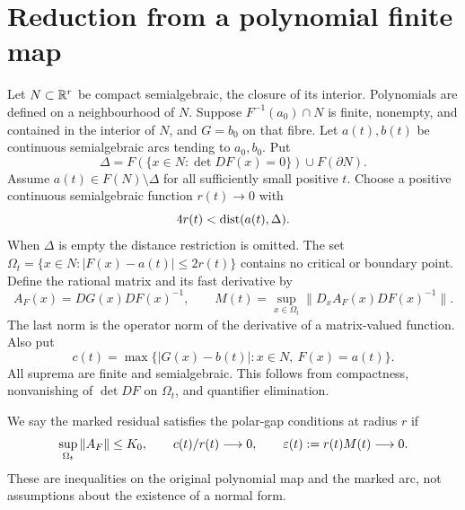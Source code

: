 \section{Reduction from a polynomial finite map}\label{sec:reduction}
Let $N\subset\mathbb R^r$ be compact semialgebraic, the closure of its interior. Polynomials are defined on a neighbourhood of $N$. Suppose $F^{-1}(a_0)\cap N$ is finite, nonempty, and contained in the interior of $N$, and $G=b_0$ on that fibre. Let $a(t),b(t)$ be continuous semialgebraic arcs tending to $a_0,b_0$. Put
\begin{equation}\label{eq:discriminant}
 \Delta=F(\{x\in N:\det DF(x)=0\})\cup F(\partial N).
\end{equation}
Assume $a(t)\in F(N)\setminus\Delta$ for all sufficiently small positive $t$. Choose a positive continuous semialgebraic function $r(t)\to0$ with
\[
 4r(t)<\operatorname{dist}(a(t),\Delta).
\]
When $\Delta$ is empty the distance restriction is omitted. The set
$\Omega_t=\{x\in N:|F(x)-a(t)|\le 2r(t)\}$ contains no critical or boundary point. Define the rational matrix and its fast derivative by
\begin{equation}\label{eq:polar-derivatives}
 A_F(x)=DG(x)DF(x)^{-1},\qquad
 M(t)=\sup_{x\in\Omega_t}\|D_x A_F(x)DF(x)^{-1}\|.
\end{equation}
The last norm is the operator norm of the derivative of a matrix-valued function. Also put
\[
 c(t)=\max\{|G(x)-b(t)|:x\in N,\ F(x)=a(t)\}.
\]
All suprema are finite and semialgebraic. This follows from compactness, nonvanishing of $\det DF$ on $\Omega_t$, and quantifier elimination.

\begin{definition}\label{def:gap}
We say the marked residual satisfies the polar-gap conditions at radius $r$ if
\begin{equation}\label{eq:gap}
 \sup_{\Omega_t}\|A_F\|\le K_0,\qquad
 c(t)/r(t)\longrightarrow0,\qquad
 \varepsilon(t):=r(t)M(t)\longrightarrow0.
\end{equation}
These are inequalities on the original polynomial map and the marked arc, not assumptions about the existence of a normal form.
\end{definition}

